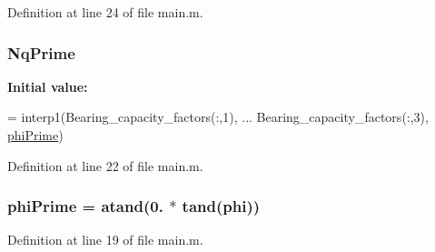 Definition at line 24 of file main.\+m.

\hypertarget{a00006_ade3072591b86caf4be69b3a9c353f213}{}
\subsubsection[{Nq\+Prime}]{\setlength{\rightskip}{0pt plus 5cm}Nq\+Prime}\label{a00006_ade3072591b86caf4be69b3a9c353f213}
{\bfseries Initial value\+:}
\begin{DoxyCode}
= interp1(Bearing\_capacity\_factors(:,1), ...
  Bearing\_capacity\_factors(:,3), \hyperlink{a00006_a430c21324a0c2608090a5bb4e98d093c}{phiPrime})
\end{DoxyCode}


Definition at line 22 of file main.\+m.

\hypertarget{a00006_a430c21324a0c2608090a5bb4e98d093c}{}
\subsubsection[{phi\+Prime}]{\setlength{\rightskip}{0pt plus 5cm}phi\+Prime = atand(0. $\ast$ tand(phi))}\label{a00006_a430c21324a0c2608090a5bb4e98d093c}


Definition at line 19 of file main.\+m.

